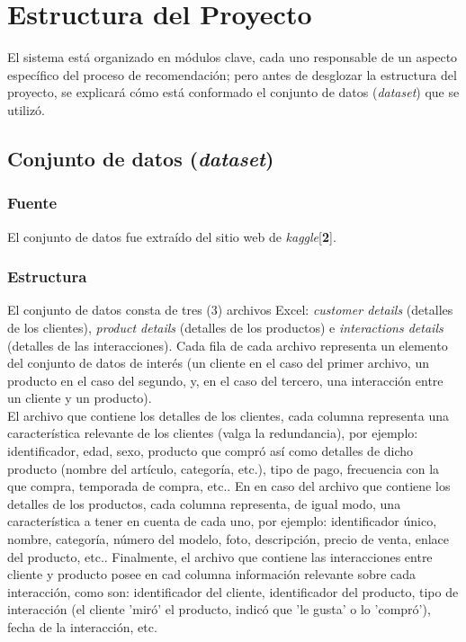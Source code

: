 \documentclass{llncs}
\begin{document}
\section{Estructura del Proyecto}
El sistema está organizado en módulos clave, cada uno responsable de un aspecto específico del proceso de recomendación; pero antes de desglozar la estructura del proyecto, se explicará cómo está conformado el conjunto de datos (\textit{dataset}) que se utilizó.\\

\subsection{Conjunto de datos (\textit{dataset})}

\subsubsection{Fuente\\}
El conjunto de datos fue extraído del sitio web de \textit{kaggle}[\textbf{2}].

\subsubsection{Estructura\\}
El conjunto de datos consta de tres (3) archivos Excel: \textit{customer details} (detalles de los clientes), \textit{product details} (detalles de los productos) e \textit{interactions details} (detalles de las interacciones). Cada fila de cada archivo representa un elemento del conjunto de datos de interés (un cliente en el caso del primer archivo, un producto en el caso del segundo, y, en el caso del tercero, una interacción entre un cliente y un producto).\\
El archivo que contiene los detalles de los clientes, cada columna representa una característica relevante de los clientes (valga la redundancia), por ejemplo: identificador, edad, sexo, producto que compró así como detalles de dicho producto (nombre del artículo, categoría, etc.), tipo de pago, frecuencia con la que compra, temporada de compra, etc.. En en caso del archivo que contiene los detalles de los productos, cada columna representa, de igual modo, una característica a tener en cuenta de cada uno, por ejemplo: identificador único, nombre, categoría, número del modelo, foto, descripción, precio de venta, enlace del producto, etc.. Finalmente, el archivo que contiene las interacciones entre cliente y producto posee en cad columna información relevante sobre cada interacción, como son: identificador del cliente, identificador del producto, tipo de interacción (el cliente 'miró' el producto, indicó que 'le gusta' o lo 'compró'), fecha de la interacción, etc.
\end{document}

